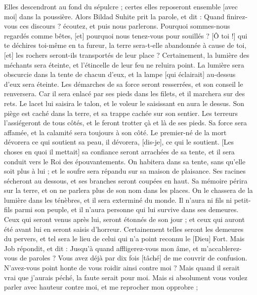 \begin{multicols}{2}
Elles descendront au fond du sépulcre ; certes elles reposeront ensemble [avec moi] dans la poussière.
\VerseOne{}Alors Bildad Suhite prit la parole, et dit :
Quand finirez-vous ces discours ? écoutez, et puis nous parlerons.
Pourquoi sommes-nous regardés comme bêtes, [et] pourquoi nous tenez-vous pour souillés ?
[Ô toi !] qui te déchires toi-même en ta fureur, la terre sera-t-elle abandonnée à cause de toi, [et] les rochers seront-ils transportés de leur place ?
Certainement, la lumière des méchants sera éteinte, et l'étincelle de leur feu ne reluira point.
La lumière sera obscurcie dans la tente de chacun d'eux, et la lampe [qui éclairait] au-dessus d'eux sera éteinte.
Les démarches de sa force seront resserrées, et son conseil le renversera.
Car il sera enlacé par ses pieds dans les filets, et il marchera sur des rets.
Le lacet lui saisira le talon, et le voleur le saisissant en aura le dessus.
Son piège est caché dans la terre, et sa trappe cachée sur son sentier.
Les terreurs l'assiégeront de tous côtés, et le feront trotter çà et là de ses pieds.
Sa force sera affamée, et la calamité sera toujours à son côté.
Le premier-né de la mort dévorera ce qui soutient sa peau, il dévorera, [dis-je], ce qui le soutient.
[Les choses en quoi il mettait] sa confiance seront arrachées de sa tente, et il sera conduit vers le Roi des épouvantements.
On habitera dans sa tente, sans qu'elle soit plus à lui ; et le soufre sera répandu sur sa maison de plaisance.
Ses racines sécheront au dessous, et ses branches seront coupées en haut.
Sa mémoire périra sur la terre, et on ne parlera plus de son nom dans les places.
On le chassera de la lumière dans les ténèbres, et il sera exterminé du monde.
Il n'aura ni fils ni petit-fils parmi son peuple, et il n'aura personne qui lui survive dans ses demeures.
Ceux qui seront venus après lui, seront étonnés de son jour ; et ceux qui auront été avant lui en seront saisis d'horreur.
Certainement telles seront les demeures du pervers, et tel sera le lieu de celui qui n'a point reconnu le [Dieu] Fort.
\VerseOne{}Mais Job répondit, et dit :
Jusqu'à quand affligerez-vous mon âme, et m'accablerez-vous de paroles ?
Vous avez déjà par dix fois [tâché] de me couvrir de confusion. N'avez-vous point honte de vous roidir ainsi contre moi ?
Mais quand il serait vrai que j'aurais péché, la faute serait pour moi.
Mais si absolument vous voulez parler avec hauteur contre moi, et me reprocher mon opprobre ;

\end{multicols}

